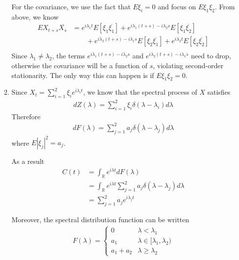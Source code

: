\documentclass[12pt]{article}
\theoremstyle{plain}
\theoremstyle{definition}
\theoremstyle{remark}
\begin{document}
\begin{enumerate}
\begin{enumerate}
        For the covariance, we use the fact that $E\xi_i=0$ and focus
        on $E\xi_1\xi_2$. From above, we know
        \begin{align*}
          EX_{t+s}\overline{X_s}
          &= e^{i\lambda_1 t}E[ \xi_1\overline{\xi_1} ]
             + e^{i\lambda_1 (t+s)-i\lambda_2 s}E[ \xi_1\overline{\xi_2} ]\\
          &\qquad
             + e^{i\lambda_2 (t+s)-i\lambda_1 s}E[ \xi_2\overline{\xi_1}]
            + e^{i\lambda_2 t}E[ \xi_2\overline{\xi_2} ] \\
        \end{align*}
        Since $\lambda_1\neq \lambda_2$, the terms $e^{i\lambda_1
        (t+s)-i\lambda_2 s}$ and $e^{i\lambda_2 (t+s)-i\lambda_1 s}$
        need to drop, otherwise the covariance will be a function of
        $s$, violating second-order stationarity. The only way this can
        happen is if $E\xi_1\xi_2=0$.

      \item %
        Since $X_t = \sum^2_{i=1}\xi_i e^{i\lambda_i t}$, we know that
        the spectral process of $X$ satisfies
        \begin{align*}
          dZ(\lambda) = \sum^2_{i=1} \xi_i \delta(\lambda -\lambda_i) d\lambda
        \end{align*}
        Therefore
        \begin{align*}
          dF(\lambda) = \sum^2_{j=1} a_j \delta(\lambda -\lambda_j) d\lambda
        \end{align*}
        where $E|\xi_j|^2 = a_j$.

        As a result
        \begin{align*}
          C(t) &= \int_\mathbb{R} e^{i\lambda t} dF(\lambda) \\
            &= \int_\mathbb{R} e^{i\lambda t}
              \sum^2_{j=1} a_j \delta(\lambda -\lambda_j) d\lambda \\
            &= \sum^2_{j=1} a_j e^{i\lambda_j t}
        \end{align*}

        Moreover, the spectral distribution function can be written
        \begin{align*}
         F(\lambda) =
          \begin{cases}
            0 & \lambda < \lambda_1 \\
            a_1 & \lambda \in [\lambda_1,\lambda_2)\\
            a_1+a_2 & \lambda \geq \lambda_2
          \end{cases}
        \end{align*}


\end{enumerate}
\end{enumerate}
\end{document}
